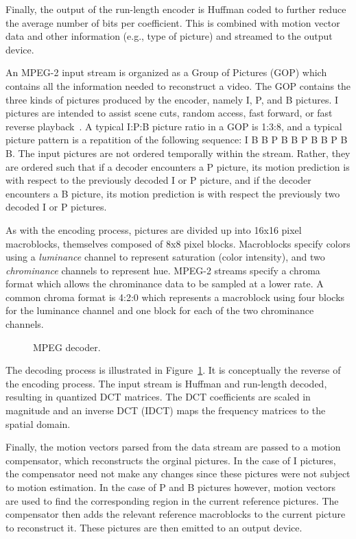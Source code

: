 Finally, the output of the run-length encoder is Huffman coded to 
further reduce the average number of bits per coefficient. This is
combined with motion vector data and other information (e.g., 
type of picture) and streamed to the output device.


An MPEG-2 input stream is organized as a  Group of Pictures (GOP)
which contains all the information needed to reconstruct a video. The
GOP contains the three kinds of pictures produced by the encoder,
namely I, P, and B pictures. I pictures are intended to assist scene
cuts, random access, fast forward, or fast reverse
playback~\cite{MPEG2, Page 14 6.1.1.7}. A typical I:P:B picture ratio
in a GOP is 1:3:8, and a typical picture pattern is a
repatition of the following sequence: I B B P B B P B B P B B. The
input pictures are not ordered temporally within the stream. Rather,
they are ordered such that if a decoder encounters a P picture, its
motion prediction is with respect to the previously decoded I or P
picture, and if the decoder encounters a B picture, its motion
prediction is with respect the previously two decoded I or P pictures.

As with the encoding process, pictures are divided up into 16x16 pixel
macroblocks, themselves composed of 8x8 pixel blocks. Macroblocks
specify colors using a {\it luminance} channel to represent saturation
(color intensity), and two {\it chrominance} channels to represent
hue. MPEG-2 streams specify a chroma format which allows the
chrominance data to be sampled at a lower rate. A common chroma format
is 4:2:0 which represents a macroblock using four blocks for the
luminance channel and one block for each of the two chrominance
channels.

\begin{figure}[t]
\begin{center}
\vspace{-12pt}
 \caption{MPEG decoder.}
 \label{fig:mpeg-decoder}
\end{center}
\end{figure}

The decoding process is illustrated in
Figure~\ref{fig:mpeg-decoder}. It is conceptually the reverse of the
encoding process. The input stream is Huffman and run-length decoded,
resulting in quantized DCT matrices. The DCT coefficients are scaled
in magnitude and an inverse DCT (IDCT) maps the frequency matrices to
the spatial domain.

Finally, the motion vectors parsed from the data stream are passed to
a motion compensator, which reconstructs the orginal pictures. In the
case of I pictures, the compensator need not make any changes since
these pictures were not subject to motion estimation. In the case of P
and B pictures however, motion vectors are used to find the
corresponding region in the current reference pictures. The
compensator then adds the relevant reference macroblocks to the
current picture to reconstruct it. These pictures are then emitted to
an output device.